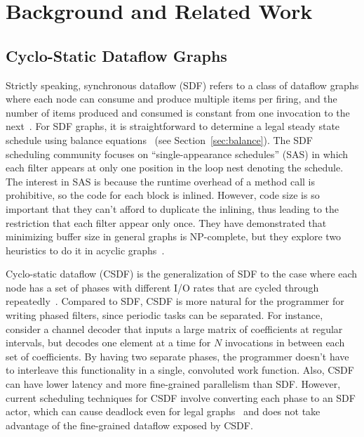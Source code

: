 \section{Background and Related Work}
\label{sec:related}

\subsection{Cyclo-Static Dataflow Graphs}

Strictly speaking, synchronous dataflow (SDF) refers to a class of
dataflow graphs where each node can consume and produce multiple items
per firing, and the number of items produced and consumed is constant
from one invocation to the next~\cite{LM87-i,LM87-ii}.  For SDF
graphs, it is straightforward to determine a legal steady state
schedule using balance equations~\cite{leesdf} (see
Section~\ref{sec:balance}).  The SDF scheduling community focuses on
``single-appearance schedules'' (SAS) in which each filter appears at
only one position in the loop nest denoting the schedule.  The
interest in SAS is because the runtime overhead of a method call is
prohibitive, so the code for each block is inlined.  However, code
size is so important that they can't afford to duplicate the inlining,
thus leading to the restriction that each filter appear only once.
They have demonstrated that minimizing buffer size in general graphs
is NP-complete, but they explore two heuristics to do it in acyclic
graphs~\cite{Bhatta97}.

Cyclo-static dataflow (CSDF) is the generalization of SDF to the case
where each node has a set of phases with different I/O rates that are
cycled through repeatedly~\cite{BELP96,Parks95}.  Compared to SDF,
CSDF is more natural for the programmer for writing phased filters,
since periodic tasks can be separated.  For instance, consider a
channel decoder that inputs a large matrix of coefficients at regular
intervals, but decodes one element at a time for $N$ invocations in
between each set of coefficients.  By having two separate phases, the
programmer doesn't have to interleave this functionality in a single,
convoluted work function.  Also, CSDF can have lower latency and more
fine-grained parallelism than SDF.  However, current scheduling
techniques for CSDF involve converting each phase to an SDF actor,
which can cause deadlock even for legal graphs~\cite{BELP96} and does
not take advantage of the fine-grained dataflow exposed by CSDF.


